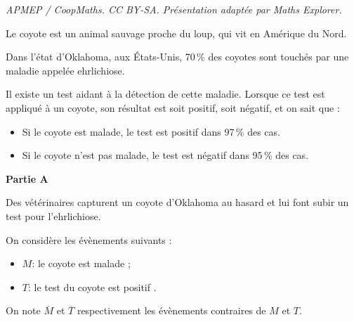 \documentclass[10pt]{article}
\begin{document}
\noindent\textit{APMEP / CoopMaths. CC BY-SA. Présentation adaptée par Maths Explorer.}\par\medskip
\medskip

Le coyote est un animal sauvage proche du loup, qui vit en Amérique du Nord.

Dans l'état d'Oklahoma, aux États-Unis, 70\,\% des coyotes sont touchés par une maladie appelée ehrlichiose.

Il existe un test aidant à la détection de cette maladie. Lorsque ce test est appliqué à un coyote, son résultat est soit positif, soit négatif, et on sait que :

\setlength\parindent{1cm}
\begin{itemize}
\item[$\bullet~~$] Si le coyote est malade, le test est positif dans 97\,\% des cas.
\item[$\bullet~~$] Si le coyote n'est pas malade, le test est négatif dans 95\,\% des cas.
\end{itemize}
\setlength\parindent{0cm}

\bigskip

\textbf{Partie A}

\medskip

Des vétérinaires capturent un coyote d'Oklahoma au hasard et lui font subir un test pour l'ehrlichiose.

On considère les évènements suivants :

\setlength\parindent{1cm}
\begin{itemize}
\item[$\bullet~~$]$M$: \og le coyote est malade \fg;
\item[$\bullet~~$]$T$: \og le test du coyote est positif \fg.
\end{itemize}
\setlength\parindent{0cm}

On note $\overline{M}$ et $\overline{T}$ respectivement les évènements contraires de $M$ et $T$.

\medskip
\end{document}
